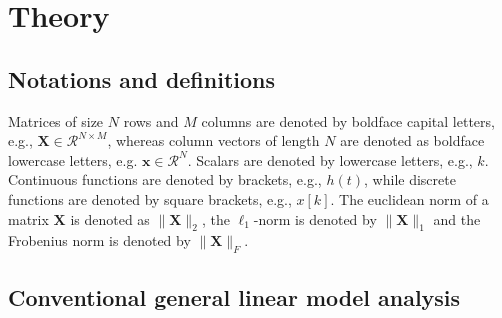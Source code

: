 
\section{Theory}


\subsection{Notations and definitions}

Matrices of size $N$ rows and $M$ columns are denoted by boldface capital letters, e.g., $\mathbf{X} \in \mathcal{R}^{N\times M}$, whereas column vectors of length $N$ are denoted as boldface lowercase letters, e.g. $\mathbf{x} \in \mathcal{R}^{N}$. Scalars are denoted by lowercase letters, e.g., $k$. Continuous functions are denoted by brackets, e.g., $h(t)$, while discrete functions are denoted by square brackets, e.g., $x[k]$. The euclidean norm of a matrix $\mathbf{X}$ is denoted as $\|\mathbf{X}\|_2$, the $\ell_1$-norm is denoted by $\| \mathbf{X} \|_1$ and the Frobenius norm is denoted by $\| \mathbf{X} \|_F$. %

\subsection{Conventional general linear model analysis}

